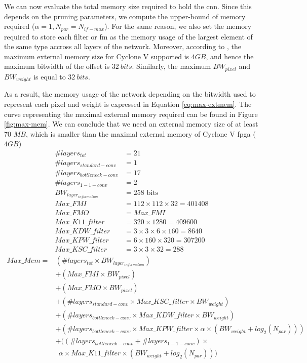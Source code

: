 %
We can now evaluate the total memory size required to hold the \acrshort{cnn}. Since this depends on the pruning parameters, we compute the upper-bound of memory required ($\alpha = 1, N_{par} = N_{if-max}$). For the same reason, we also set the memory required to store each filter or \acrshort{fm} as the memory usage of the largest element of the same type accross all layers of the network. Moreover, according to \cite{noauthor_cyclone_2018}, the maximum external memory size for Cyclone V supported is $4GB$, and hence the maximum bitwidth of the offset is $32 \ bits$. Similarly, the maximum $BW_{pixel}$ and $BW_{weight}$ is equal to $32 \ bits$.

As a result, the memory usage of the network depending on the bitwidth used to represent each pixel and weight is expressed in Equation \eqref{eq:max-extmem}.
The curve representing the maximal external memory required can be found in Figure \ref{fig:max-mem}. We can conclude that we need an external memory size of at least 70 $MB$, which is smaller than the maximal external memory of Cyclone V \acrshort{fpga} ($4 GB$)
%
\begin{align}
    \# layers_{tot} &= 21 \\
    \# layers_{standard-conv} &= 1 \\
    \# layers_{bottleneck-conv} &= 17 \\
    \# layers_{1-1-conv} &= 2 \\
    BW_{layer_{information}} &= 258 \text{ bits} \\
    Max\_FMI &= 112 \times 112 \times 32 = 401408 \\
    Max\_FMO &= Max\_FMI \\
    Max\_K11\_filter &= 320 \times 1280 = 409600 \\
    Max\_KDW\_filter &= 3 \times 3 \times 6 \times 160 = 8640\\
    Max\_KPW\_filter &= 6 \times 160 \times 320 = 307200 \\
    Max\_KSC\_filter &= 3 \times 3 \times 32 = 288
\end{align}
%
\begin{equation}
    \begin{split}
        Max\_Mem = &\left(\# layers_{tot} \times BW_{layer_{information}} \right) \\
        &+ \left( Max\_FMI \times BW_{pixel} \right) \\
        &+ \left( Max\_FMO \times BW_{pixel} \right) \\
        &+ \left( \# layers_{standard-conv} \times Max\_KSC\_filter \times BW_{weight} \right) \\
        &+ \left( \# layers_{bottleneck-conv} \times Max\_KDW\_filter \times BW_{weight} \right)\\
        &+ \left( \# layers_{bottleneck-conv} \times Max\_KPW\_filter \times \alpha \times(BW_{weight} + log_2(N_{par})) \right)\\
        &+ ( \left(\# layers_{bottleneck-conv} + \# layers_{1-1-conv}\right) \times \\
        & \ \ \alpha \times Max\_K11\_filter \times  (BW_{weight} + log_2(N_{par})) )
    \end{split}
\label{eq:max-extmem}
\end{equation}
